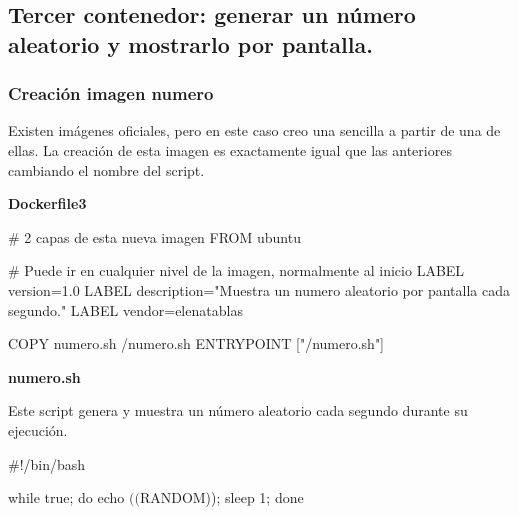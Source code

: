 

\subsection{Tercer contenedor: generar un número aleatorio y mostrarlo por pantalla.}

\subsubsection{Creación imagen numero}
\par Existen imágenes oficiales, pero en este caso creo una sencilla a partir de una de ellas.
La creación de esta imagen es exactamente igual que las anteriores cambiando el nombre del script.
\par \textbf{Dockerfile3}
\begin{listing}
    # 2 capas de esta nueva imagen
    FROM ubuntu
    
    # Puede ir en cualquier nivel de la imagen, normalmente al inicio
    LABEL version=1.0
    LABEL description="Muestra un numero aleatorio por pantalla cada segundo." 
    LABEL vendor=elenatablas
    
    COPY numero.sh /numero.sh
    ENTRYPOINT ["/numero.sh"] 
\end{listing}

\par \textbf{numero.sh}
\par Este script genera y muestra un número aleatorio cada segundo durante su ejecución.
\begin{listing}
    #!/bin/bash

    while true; do echo $(($RANDOM)); sleep 1; done  
\end{listing}
